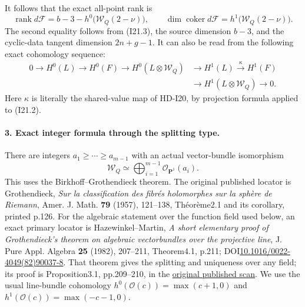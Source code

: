 It follows that the exact all-point rank is
\begin{equation}
 \boxed{\operatorname{rank}d\mathcal F
          =b-3-h^0\bigl(\mathcal W_Q(2-\nu)\bigr),
 \qquad
 \dim\operatorname{coker}d\mathcal F
          =h^1\bigl(\mathcal W_Q(2-\nu)\bigr).}        \tag{I21.7}
\end{equation}
The second equality follows from (I21.3), the source dimension
$b-3$, and the cyclic-data tangent dimension $2n+g-1$.
It can also be read from the following exact cohomology sequence:
\begin{align*}
 0\to H^0(L)\to H^0(F)\to H^0(L\otimes\mathcal W_Q)
       &\to H^1(L)\xrightarrow{\kappa}H^1(F)\\
       &\to H^1(L\otimes\mathcal W_Q)\to0.
\end{align*}
Here $\kappa$ is literally the shared-value map of HD-I20,
by projection formula applied to (I21.2).

\paragraph{3. Exact integer formula through the splitting type.}
There are integers $a_1\geq\cdots\geq a_{m-1}$ with an
actual vector-bundle isomorphism
\begin{equation}
       \mathcal W_Q\simeq\bigoplus_{i=1}^{m-1}
                                     \mathcal O_{\mathbf P^1}(a_i).
                                                        \tag{I21.8}
\end{equation}
This uses the Birkhoff--Grothendieck theorem. The original
published locator is Grothendieck, \emph{Sur la classification des
fibr\'es holomorphes sur la sph\`ere de Riemann}, Amer. J. Math.
\textbf{79} (1957), 121--138, Th\'eor\`eme2.1 and its corollary,
printed p.126. For the algebraic statement over the function field
used below, an exact primary locator is Hazewinkel--Martin,
\emph{A short elementary proof of Grothendieck's theorem on algebraic
vectorbundles over the projective line}, J. Pure Appl. Algebra
\textbf{25} (1982), 207--211, Theorem4.1, p.211;
DOI\href{https://doi.org/10.1016/0022-4049(82)90037-8}
{10.1016/0022-4049(82)90037-8}. That theorem gives the splitting
and uniqueness over any field; its proof is Proposition3.1,
pp.209--210, in the
\href{https://ir.cwi.nl/pub/10153/10153D.pdf}{original published scan}.
We use the usual line-bundle cohomology
$h^0(\mathcal O(c))=\max(c+1,0)$ and
$h^1(\mathcal O(c))=\max(-c-1,0)$.

